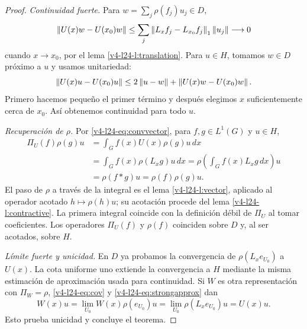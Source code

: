 \begin{proof}
\textit{Continuidad fuerte.} Para $w=\sum_j\rho(f_j)u_j\in D$,
\[
\left\lVert U(x)w-U(x_0)w\right\rVert
\leq\sum_j\left\lVert L_xf_j-L_{x_0}f_j\right\rVert_1\left\lVert u_j\right\rVert\longrightarrow0
\]
cuando $x\to x_0$, por el lema \ref{v4-l24-l:translation}. Para $u\in H$, tomamos $w\in D$ próximo a $u$ y usamos unitariedad:
\[
\left\lVert U(x)u-U(x_0)u\right\rVert
\leq2\left\lVert u-w\right\rVert+\left\lVert U(x)w-U(x_0)w\right\rVert.
\]
Primero hacemos pequeño el primer término y después elegimos $x$ suficientemente cerca de $x_0$. Así obtenemos continuidad para todo $u$.

\textit{Recuperación de $\rho$.} Por \eqref{v4-l24-eq:convvector}, para $f,g\in L^1(G)$ y $u\in H$,
\begin{align*}
\Pi_U(f)\rho(g)u
&=\int_G f(x)U(x)\rho(g)u\,dx\\
&=\int_G f(x)\rho(L_xg)u\,dx
=\rho\left(\int_G f(x)L_xg\,dx\right)u\\
&=\rho(f*g)u=\rho(f)\rho(g)u.
\end{align*}
El paso de $\rho$ a través de la integral es el lema \ref{v4-l24-l:vector}, aplicado al operador acotado $h\mapsto\rho(h)u$; su acotación procede del lema \ref{v4-l24-l:contractive}. La primera integral coincide con la definición débil de $\Pi_U$ al tomar coeficientes. Los operadores $\Pi_U(f)$ y $\rho(f)$ coinciden sobre $D$ y, al ser acotados, sobre $H$.

\textit{Límite fuerte y unicidad.} En $D$ ya probamos la convergencia de $\rho(L_xe_{U_0})$ a $U(x)$. La cota uniforme uno extiende la convergencia a $H$ mediante la misma estimación de aproximación usada para continuidad. Si $W$ es otra representación con $\Pi_W=\rho$, \eqref{v4-l24-eq:cov} y \eqref{v4-l24-eq:strongapprox} dan
\[
W(x)u=\lim_{U_0}W(x)\rho(e_{U_0})u
=\lim_{U_0}\rho(L_xe_{U_0})u=U(x)u.
\]
Esto prueba unicidad y concluye el teorema.
\end{proof}

